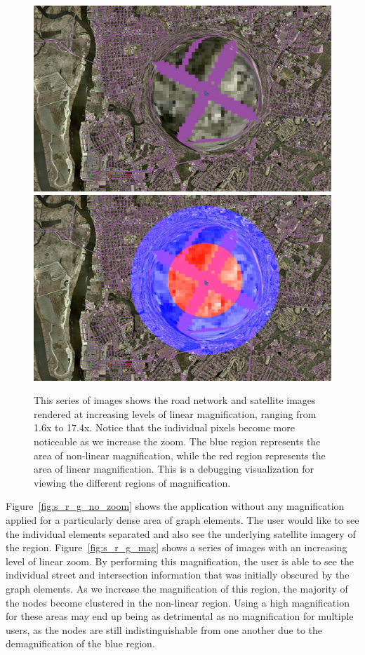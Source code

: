 \begin{figure}[htp]
    \includegraphics[width=0.49\linewidth]{img/s_r_30_zoom.jpg}
    \includegraphics[width=0.49\linewidth]{img/s_r_30_zoom_color.jpg}
    \caption[Satellite Images and Road Network with 1.6x to 17.4x Linear Magnification]{This series of images 
    shows the road network and satellite images rendered at increasing levels of linear magnification, ranging 
    from 1.6x to 17.4x. Notice that the individual pixels become more noticeable as we increase the zoom. The 
    blue region represents the area of non-linear magnification, while the red region represents the area of 
    linear magnification. This is a debugging visualization for viewing the different regions of magnification.}
    \label{fig:s_r_mag}
\end{figure}

Figure~\ref{fig:s_r_g_no_zoom} shows the application without any magnification applied for a particularly dense area of graph elements. The user would like to see the individual elements separated and also see the underlying satellite imagery of the region. Figure~\ref{fig:s_r_g_mag} shows a series of images with an increasing level of linear zoom. By performing this magnification, the user is able to see the individual street and intersection information that was initially
obscured by the graph elements. As we increase the magnification of this region, the majority of the nodes become clustered in the non-linear region. Using a high magnification for these areas may end up being as detrimental as no magnification for multiple users, as the nodes are still indistinguishable from one another due to the demagnification of the blue region.

